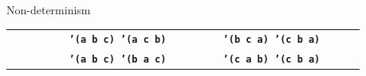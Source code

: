\documentclass{beamer}
\begin{document}
\begin{frame}{Non-determinism}
  \tiny
  \begin{tabularx}{\textwidth}{ X X }
    \texttt{\ \newline
      \ \newline
      \ \newline
      \ \newline
      \ \newline
      \hphantom{\_\_\_\_\_\_}\textbf{'(a b c)\newline
      \hphantom{\_\_\_\_\_\_}'(a c b)}\newline
      \ 
    }
    &
    \texttt{\ \newline
      \ \newline
      \ \newline
      \hphantom{\_\_\_\_\_\_}\textbf{'(b c a)\newline
      \hphantom{\_\_\_\_\_\_}'(c b a)}\newline
      \ \newline
      \ \newline
      \ 
    }

    \\

    \texttt{\ \newline
      \ \newline
      \ \newline
      \ \newline
      \ \newline
      \hphantom{\_\_\_\_\_\_}\textbf{'(a b c)\newline
      \hphantom{\_\_\_\_\_\_}'(b a c)}\newline
      \ 
    }
    &
    \texttt{\ \newline
      \ \newline
      \ \newline
      \hphantom{\_\_\_\_\_\_}\textbf{'(c a b)\newline
      \hphantom{\_\_\_\_\_\_}'(c b a)}\newline
      \ \newline
      \ \newline
      \ 
    }

  \end{tabularx}
\end{frame}
\end{document}
